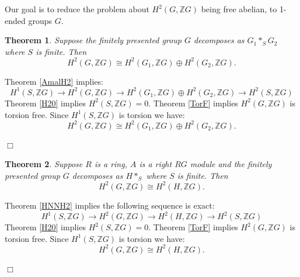 \documentclass[12pt]{article}
\newtheorem{theorem}{Theorem}[subsection]
\newtheorem{corollary}[theorem]{Corollary}
\newenvironment{proof}{\addvspace{12pt}\noindent{\bf Proof:}}{
$\Box$\par\addvspace{12pt}}
\begin{document}
 Our goal is to reduce the problem about $H^2(G,\mathbb ZG)$ being free abelian, to 1-ended groups $G$. 
 
 \begin{theorem} \label{AmalRed} 
 Suppose the finitely presented group $G$ decomposes as $G_1\ast_SG_2$ where $S$ is finite. Then 
 $$H^2(G,\mathbb ZG)\cong  H^2(G_1,\mathbb ZG)\oplus H^2(G_2,\mathbb ZG).$$
 \end{theorem}
 \begin{proof}
Theorem \ref{AmalH2} implies:  
$$H^1(S,\mathbb ZG)\to H^2(G,\mathbb ZG)\to H^2(G_1,\mathbb ZG)\oplus H^2(G_2,\mathbb ZG)\to H^2(S, \mathbb ZG)$$ Theorem \ref{H20} implies $H^2(S, \mathbb ZG)=0$. Theorem \ref{TorF} implies $H^2(G,\mathbb ZG)$ is torsion free. Since $H^1(S,\mathbb ZG)$ is torsion we have: 
$$H^2(G,\mathbb ZG)\cong  H^2(G_1,\mathbb ZG)\oplus H^2(G_2,\mathbb ZG).$$
 \end{proof}
 
\begin{theorem} \label{HNNRed} 
Suppose $R$ is a ring, $A$ is a right $RG$ module and the finitely presented group $G$ decomposes as $H\ast_S$ where $S$ is finite. Then 
 $$H^2(G,\mathbb ZG)\cong  H^2(H,\mathbb ZG).$$
 \end{theorem}
 \begin{proof}
Theorem \ref{HNNH2} implies the following sequence is exact:
$$H^1(S,\mathbb ZG)\to H^2(G,\mathbb ZG)\to H^2(H,\mathbb ZG)\to H^2(S, \mathbb ZG)$$
Theorem \ref{H20} implies $H^2(S, \mathbb ZG)=0$. Theorem \ref{TorF} implies $H^2(G,\mathbb ZG)$ is torsion free. Since $H^1(S,\mathbb ZG)$ is torsion we have: 
$$H^2(G,\mathbb ZG)\cong  H^2(H,\mathbb ZG).$$
 \end{proof}

 
\end{document}

